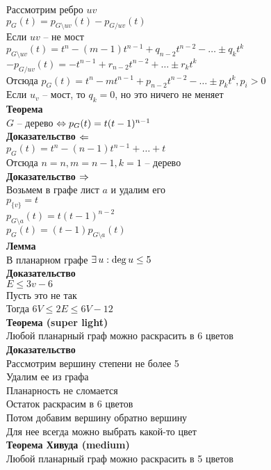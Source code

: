 \documentclass[12pt]{article}
\begin{document}
Рассмотрим ребро $uv$\\
$p_G(t) = p_{G\setminus uv}(t) - p_{G / uv}(t)$\\
Если $uv$ -- не мост\\
$p_{G\setminus uv}(t) = t^n - (m-1)t^{n-1} + q_{n-2}t^{n-2} - \ldots \pm q_k t^k$\\
$-p_{G / uv}(t) = -t^{n-1} + r_{n-2}t^{n-2} + \ldots \pm r_k t^k$\\
Отсюда $p_G(t) = t^n - mt^{n-1} + p_{n-2}t^{n-2} - \ldots \pm p_{k}t^k, p_i > 0$\\
Если $u_v$ -- мост, то $q_k = 0$, но это ничего не меняет\\
\textbf{Теорема}\\
$G$ -- дерево $\Leftrightarrow p_G(t)=t(t-1)^{n-1}$\\
\textbf{Доказательство $\Leftarrow$}\\
$p_G(t) = t^n - (n-1)t^{n-1} + \ldots + t$\\
Отсюда $n=n, m = n-1, k = 1$ -- дерево\\
\textbf{Доказательство $\Rightarrow$}\\
Возьмем в графе лист $a$ и удалим его\\
$p_{\{v\}} = t$\\
$p_{G \setminus a}(t) = t(t-1)^{n-2}$\\
$p_{G}(t) = (t-1)p_{G \setminus a}(t)$\\
\textbf{Лемма}\\
В планарном графе $\exists\, u: \deg u \leq 5$\\
\textbf{Доказательство}\\
$E \leq 3v - 6$\\
Пусть это не так\\
Тогда $6V \leq 2E \leq 6V - 12$\\
\textbf{Теорема (super light)}\\
Любой планарный граф можно раскрасить в 6 цветов\\
\textbf{Доказательство}\\
Рассмотрим вершину степени не более 5\\
Удалим ее из графа\\
Планарность не сломается\\
Остаток раскрасим в 6 цветов\\
Потом добавим вершину обратно вершину\\
Для нее всегда можно выбрать какой-то цвет\\
\textbf{Теорема Хивуда (medium)}\\
Любой планарный граф можно раскрасить в 5 цветов\\
\end{document}
